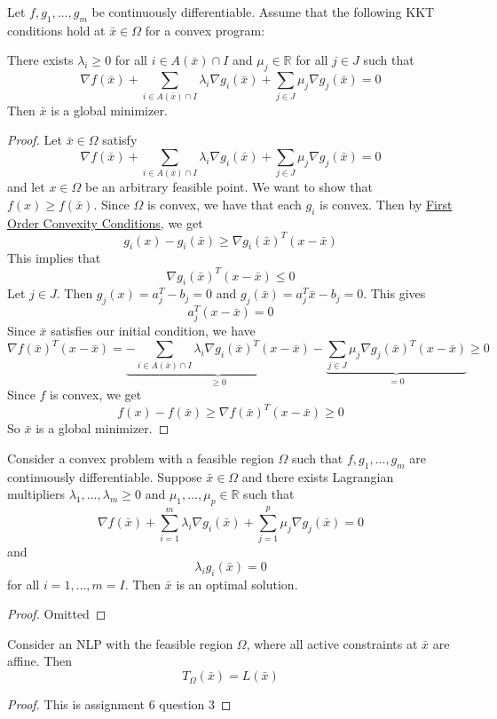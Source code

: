 \begin{theorem}[]
    Let $f, g_1,\ldots,g_m$ be continuously differentiable. Assume that the following KKT conditions hold at $\bar x \in \Omega$ for a convex program:

    There exists $\lambda_i \geq 0$ for all $i \in A(\bar x) \cap I$ and $\mu_j \in \mathbb R$ for all $j \in J$ such that $$\nabla f(\bar x) + \sum_{i \in A(\bar x) \cap I} \lambda_i \nabla g_i(\bar x) + \sum_{j \in J} \mu_j \nabla g_j(\bar x) = 0$$
    Then $\bar x$ is a global minimizer.
\end{theorem}
\begin{proof}[Proof]
    Let $\bar x \in \Omega$ satisfy $$\nabla f(\bar x) + \sum_{i \in A(\bar x) \cap I} \lambda_i \nabla g_i(\bar x) + \sum_{j \in J} \mu_j \nabla g_j(\bar x) = 0$$ and let $x \in \Omega$ be an arbitrary feasible point. We want to show that $f(x) \geq f(\bar x)$. Since $\Omega$ is convex, we have that each $g_i$ is convex. Then by \hyperref[thm:first-order-convex]{First Order Convexity Conditions}, we get 
    $$g_i(x) - g_i(\bar x) \geq \nabla g_i(\bar x)^T (x - \bar x)$$ This implies that $$\nabla g_i(\bar x)^T (x - \bar x) \leq 0$$
    Let $j \in J$. Then $g_j(x) = a_j^T - b_j = 0$ and $g_j(\bar x) = a_j^T \bar x - b_j = 0$. This gives $$a_j^T (x - \bar x) = 0$$ Since $\bar x$ satisfies our initial condition, we have 
    $$\nabla f(\bar x)^T (x - \bar x) = \underbrace{-\sum_{i \in A(\bar x) \cap I} \lambda_i \nabla g_i(\bar x)^T (x - \bar x)}_{\geq 0} - \underbrace{\sum_{j \in J} \mu_j \nabla g_j(\bar x)^T (x - \bar x)}_{= 0} \geq 0$$
    Since $f$ is convex, we get $$f(x) - f(\bar x) \geq \nabla f(\bar x)^T (x - \bar x) \geq 0$$ So $\bar x$ is a global minimizer.
\end{proof}
\begin{theorem}[]
    Consider a convex problem with a feasible region $\Omega$ such that $f, g_1,\ldots,g_m$ are continuously differentiable. Suppose $\bar x \in \Omega$ and there exists Lagrangian multipliers $\lambda_1,\ldots, \lambda_m \geq 0$ and $\mu_1,\ldots,\mu_p \in \mathbb R$ such that $$\nabla f(\bar x) + \sum^m_{i=1} \lambda_i \nabla g_i(\bar x) + \sum^p_{j=1} \mu_j \nabla g_j(\bar x) = 0$$ and $$\lambda_i g_i(\bar x) = 0$$ for all $i = 1,\ldots,m = I$. Then $\bar x$ is an optimal solution.
\end{theorem}
\begin{proof}[Proof]
    Omitted
\end{proof}
\begin{theorem}[]
    Consider an NLP with the feasible region $\Omega$, where all active constraints at $\bar x$ are affine. Then $$T_\Omega(\bar x) = L(\bar x)$$
\end{theorem}
\begin{proof}[Proof]
    This is assignment 6 question 3
\end{proof}
